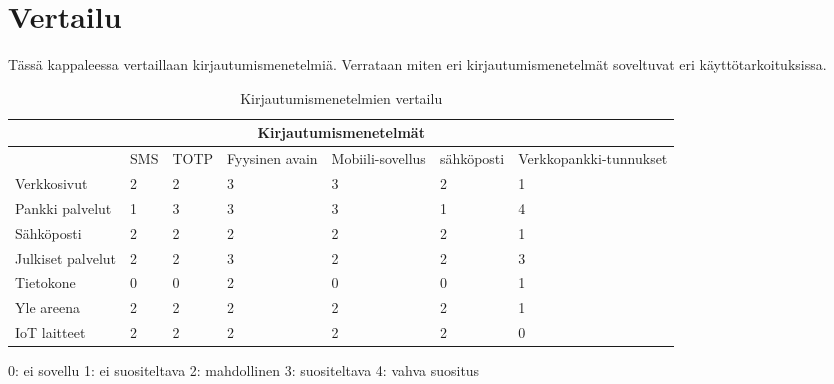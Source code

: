 \chapter{Vertailu\label{vertailu}}

Tässä kappaleessa vertaillaan kirjautumismenetelmiä. Verrataan miten eri kirjautumismenetelmät soveltuvat eri käyttötarkoituksissa.

\begin{table}[ht]
\begin{tabular}{ |p{3cm}|p{1cm}|p{}|p{}|p{}|p{2cm}|p{}|  }
 \hline
 \multicolumn{7}{|c|}{ Kirjautumismenetelmät} \\
 \hline
 & SMS & TOTP &Fyysinen avain & Mobiili-sovellus & sähköposti & Verkkopankki-tunnukset\\
 \hline
 Verkkosivut& 2 & 2 & 3 & 3 & 2 &  1\\
 Pankki palvelut& 1 & 3 & 3 & 3 & 1 &  4\\
 Sähköposti& 2 & 2 & 2 & 2 & 2 & 1 \\
 Julkiset palvelut& 2 & 2 & 3 & 2 & 2 &  3\\
 Tietokone& 0 & 0 & 2 & 0 & 0 &  1\\
 Yle areena& 2 & 2 & 2 & 2 & 2 &  1\\
 IoT laitteet& 2 & 2 & 2 & 2 & 2 &  0\\
 \hline
\end{tabular}
\caption{\label{tab:vertailu} Kirjautumismenetelmien vertailu}
\end{table}

0: ei sovellu
1: ei suositeltava
2: mahdollinen
3: suositeltava
4: vahva suositus
